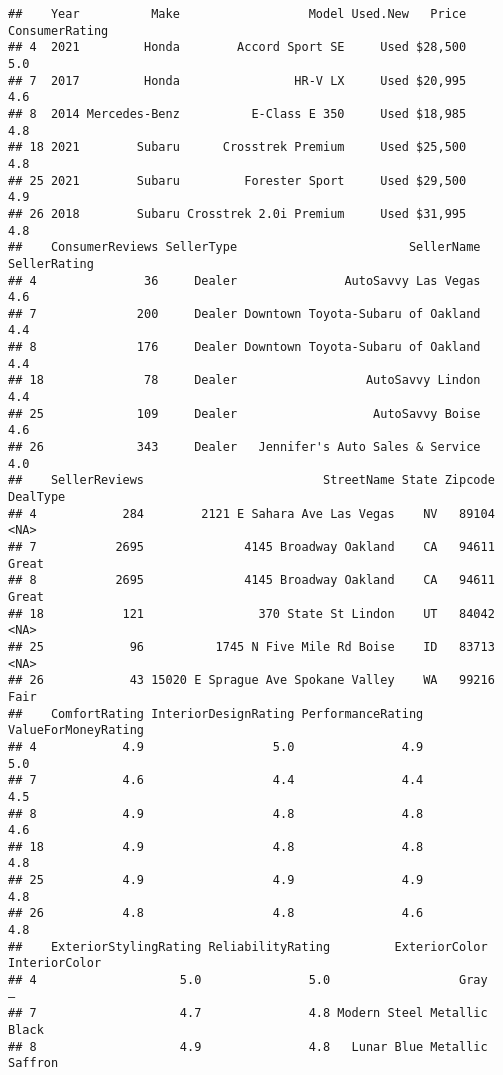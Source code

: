 \documentclass[
]{article}
\begin{document}
\begin{verbatim}
##    Year          Make                  Model Used.New   Price ConsumerRating
## 4  2021         Honda        Accord Sport SE     Used $28,500            5.0
## 7  2017         Honda                HR-V LX     Used $20,995            4.6
## 8  2014 Mercedes-Benz          E-Class E 350     Used $18,985            4.8
## 18 2021        Subaru      Crosstrek Premium     Used $25,500            4.8
## 25 2021        Subaru         Forester Sport     Used $29,500            4.9
## 26 2018        Subaru Crosstrek 2.0i Premium     Used $31,995            4.8
##    ConsumerReviews SellerType                        SellerName SellerRating
## 4               36     Dealer               AutoSavvy Las Vegas          4.6
## 7              200     Dealer Downtown Toyota-Subaru of Oakland          4.4
## 8              176     Dealer Downtown Toyota-Subaru of Oakland          4.4
## 18              78     Dealer                  AutoSavvy Lindon          4.4
## 25             109     Dealer                   AutoSavvy Boise          4.6
## 26             343     Dealer   Jennifer's Auto Sales & Service          4.0
##    SellerReviews                         StreetName State Zipcode DealType
## 4            284        2121 E Sahara Ave Las Vegas    NV   89104     <NA>
## 7           2695              4145 Broadway Oakland    CA   94611    Great
## 8           2695              4145 Broadway Oakland    CA   94611    Great
## 18           121                370 State St Lindon    UT   84042     <NA>
## 25            96          1745 N Five Mile Rd Boise    ID   83713     <NA>
## 26            43 15020 E Sprague Ave Spokane Valley    WA   99216     Fair
##    ComfortRating InteriorDesignRating PerformanceRating ValueForMoneyRating
## 4            4.9                  5.0               4.9                 5.0
## 7            4.6                  4.4               4.4                 4.5
## 8            4.9                  4.8               4.8                 4.6
## 18           4.9                  4.8               4.8                 4.8
## 25           4.9                  4.9               4.9                 4.8
## 26           4.8                  4.8               4.6                 4.8
##    ExteriorStylingRating ReliabilityRating         ExteriorColor InteriorColor
## 4                    5.0               5.0                  Gray             –
## 7                    4.7               4.8 Modern Steel Metallic         Black
## 8                    4.9               4.8   Lunar Blue Metallic       Saffron

\end{verbatim}
\end{document}
